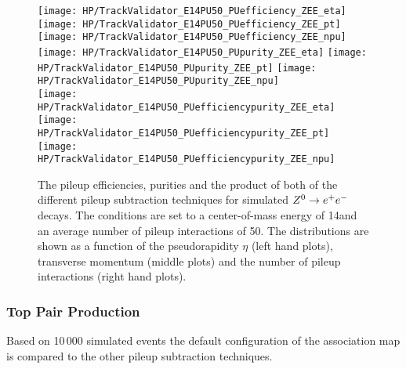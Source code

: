 \begin{figure}[!h]
  \centering
  \texttt{[image: HP/TrackValidator\_E14PU50\_PUefficiency\_ZEE\_eta]}
  \texttt{[image: HP/TrackValidator\_E14PU50\_PUefficiency\_ZEE\_pt]}
  \texttt{[image: HP/TrackValidator\_E14PU50\_PUefficiency\_ZEE\_npu]}
   \\
  \texttt{[image: HP/TrackValidator\_E14PU50\_PUpurity\_ZEE\_eta]}
  \texttt{[image: HP/TrackValidator\_E14PU50\_PUpurity\_ZEE\_pt]}
  \texttt{[image: HP/TrackValidator\_E14PU50\_PUpurity\_ZEE\_npu]}
   \\
  \texttt{[image: HP/TrackValidator\_E14PU50\_PUefficiencypurity\_ZEE\_eta]}
  \texttt{[image: HP/TrackValidator\_E14PU50\_PUefficiencypurity\_ZEE\_pt]}
  \texttt{[image: HP/TrackValidator\_E14PU50\_PUefficiencypurity\_ZEE\_npu]}
  \caption[Pileup efficiencies, purities and their product of the different pileup subtraction techniques for $\Zz\rightarrow\EE$ decays with 14\TeV and PU=50]{The pileup efficiencies, purities and the product of both of the different pileup subtraction techniques for simulated $\Zz\rightarrow\EE$ decays. The conditions are set to a center-of-mass energy of 14\TeV and an average number of pileup interactions of 50. The distributions are shown as a function of the pseudorapidity $\eta$ (left hand plots), transverse momentum (middle plots) and the number of pileup interactions (right hand plots).}
\end{figure}
\clearpage

\subsubsection{Top Pair Production}

Based on 10\,000 simulated \ttbar events the default configuration of the association map is compared to the other pileup subtraction techniques.

